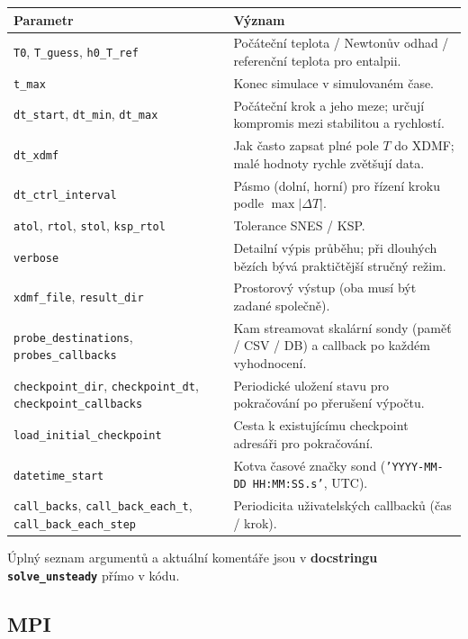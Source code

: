\documentclass[a4paper,11pt]{article}
\begin{document}
\begin{longtable}{@{}L{5.6cm} L{9.5cm}@{}}
\toprule
\textbf{Parametr} & \textbf{Význam} \\
\midrule
\endhead
\texttt{T0}, \texttt{T\_guess}, \texttt{h0\_T\_ref}
  & Počáteční teplota / Newtonův odhad / referenční teplota pro entalpii. \\
\texttt{t\_max}
  & Konec simulace v simulovaném čase. \\
\texttt{dt\_start}, \texttt{dt\_min}, \texttt{dt\_max}
  & Počáteční krok a jeho meze; určují kompromis mezi stabilitou a rychlostí. \\
\texttt{dt\_xdmf}
  & Jak často zapsat plné pole \(T\) do XDMF; malé hodnoty rychle zvětšují data. \\
\texttt{dt\_ctrl\_interval}
  & Pásmo (dolní, horní) pro řízení kroku podle \(\max|\Delta T|\). \\
\texttt{atol}, \texttt{rtol}, \texttt{stol}, \texttt{ksp\_rtol}
  & Tolerance SNES / KSP. \\
\texttt{verbose}
  & Detailní výpis průběhu; při dlouhých bězích bývá praktičtější stručný režim. \\
\texttt{xdmf\_file}, \texttt{result\_dir}
  & Prostorový výstup (oba musí být zadané společně). \\
\texttt{probe\_destinations}, \texttt{probes\_callbacks}
  & Kam streamovat skalární sondy (paměť / CSV / DB) a callback po
    každém vyhodnocení. \\
\texttt{checkpoint\_dir}, \texttt{checkpoint\_dt},
\texttt{checkpoint\_callbacks}
  & Periodické uložení stavu pro pokračování po přerušení výpočtu. \\
\texttt{load\_initial\_checkpoint}
  & Cesta k existujícímu checkpoint adresáři pro pokračování. \\
\texttt{datetime\_start}
  & Kotva časové značky sond (\texttt{'YYYY-MM-DD HH:MM:SS.s'}, UTC). \\
\texttt{call\_backs}, \texttt{call\_back\_each\_t},
\texttt{call\_back\_each\_step}
  & Periodicita uživatelských callbacků (čas / krok). \\
\bottomrule
\end{longtable}

Úplný seznam argumentů a aktuální komentáře jsou v \textbf{docstringu
\texttt{solve\_unsteady}} přímo v kódu.

\subsection*{MPI}
\end{document}
